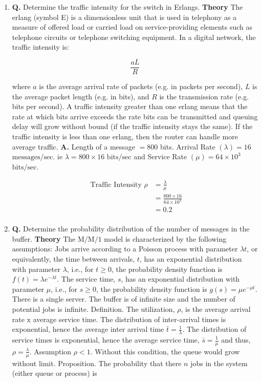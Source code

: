 \documentclass[main.tex]{subfiles}
\begin{document}
\begin{enumerate}
    \begin{enumerate}
        \item \textbf{Q.} Determine the traffic intensity for the switch in Erlangs. \textbf{Theory} The erlang (symbol E) is a dimensionless unit that is used in telephony as a measure of offered load or carried load on service-providing elements such as telephone circuits or telephone switching equipment. In a digital network, the traffic intensity is:
        
        $$
        \frac{a L}{R}
        $$
        
        where $a$ is the average arrival rate of packets (e.g. in packets per second), $L$ is the average packet length (e.g. in bits), and $R$ is the transmission rate (e.g. bits per second). A traffic intensity greater than one erlang means that the rate at which bits arrive exceeds the rate bits can be transmitted and queuing delay will grow without bound (if the traffic intensity stays the same). If the traffic intensity is less than one erlang, then the router can handle more average traffic. \textbf{A.} Length of a message $=800$ bits. Arrival Rate $(\lambda)=16$ $\mathrm{messages}/\mathrm{sec}$. ie $\lambda=800 \times 16$ $\mathrm{bits}/\mathrm{sec}$ and Service Rate $(\mu)=64 \times 10^3$ $\mathrm{bits}/\mathrm{sec}$. 
        
        $$
        \begin{aligned}
        \text { Traffic Intensity } \rho& =\frac{\lambda}{\mu} \\
        & =\frac{800 \times 16}{64 \times 10^3} \\
        & =0.2 \\
        \end{aligned}
        $$

        \item \textbf{Q.} Determine the probability distribution of the number of messages in the buffer. \textbf{Theory} The $\mathrm{M} / \mathrm{M} / 1$ model is characterized by the following assumptions: Jobs arrive according to a Poisson process with parameter $\lambda t$, or equivalently, the time between arrivals, $t$, has an exponential distribution with parameter $\lambda$, i.e., for $t \geq 0$, the probability density function is $f(t)=\lambda e^{-\lambda t}$. The service time, $s$, has an exponential distribution with parameter $\mu$, i.e., for $s \geq 0$, the probability density function is $g(s)=\mu e^{-\mu t}$. There is a single server. The buffer is of infinite size and the number of potential jobs is infinite. Definition. The utilization, $\rho$, is the average arrival rate $\mathrm{x}$ average service time. The distribution of inter-arrival times is exponential, hence the average inter arrival time $\bar{t}=\frac{1}{\lambda}$. The distribution of service times is exponential, hence the average service time, $\bar{s}=\frac{1}{\mu}$ and thus, $\rho=\frac{\lambda}{\mu}$. Assumption $\rho<1$. Without this condition, the queue would grow without limit. Proposition. The probability that there $n$ jobs in the system (either queue or process) is 
        

\end{enumerate}
\end{enumerate}
\end{document}
